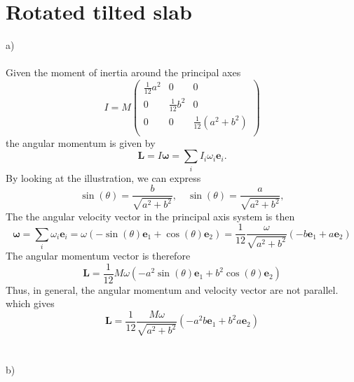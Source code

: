 \documentclass{article}
\begin{document}
    \section{Rotated tilted slab}
        a) \\ \\  
        Given the moment of inertia around the principal axes
        \begin{equation*}
            I = M
            \begin{pmatrix}
                \frac{1}{12} a^2& 0 & 0 \\
                0 & \frac{1}{12} b^2 & 0 \\
                0 & 0 & \frac{1}{12} (a^2 + b^2)\\
            \end{pmatrix}
        \end{equation*}
        the angular momentum is given by
        \begin{equation*}
            \mathbf{L} = I \mathbf{\omega} = \sum_i  I_i \omega_i  \mathbf{e}_i.
        \end{equation*}
        By looking at the illustration, we can express
        \begin{equation*}
            \sin(\theta) = \frac{b}{\sqrt{a^2 + b^2}}, \quad \sin(\theta) = \frac{a}{\sqrt{a^2 + b^2}},
        \end{equation*}
        The the angular velocity vector in the principal axis system is then
        \begin{equation*}
            \boldsymbol{\omega} = \sum_i \omega_i \mathbf{e}_i = \omega (-\sin(\theta) \mathbf{e}_1 + \cos(\theta) \mathbf{e}_2) = \frac{1}{12}\frac{\omega}{\sqrt{a^2 + b^2}}(-b \mathbf{e}_1 + a \mathbf{e}_2)
        \end{equation*} 
        The angular momentum vector is therefore
        \begin{equation*}
            \mathbf{L} = \frac{1}{12} M \omega(-a^2\sin(\theta) \mathbf{e}_1 + b^2\cos(\theta) \mathbf{e}_2)
        \end{equation*}
        Thus, in general, the angular momentum and velocity vector are not parallel. 
        which gives
        \begin{equation*}
            \mathbf{L} = \frac{1}{12}\frac{M \omega}{\sqrt{a^2 + b^2}}(-a^2b \mathbf{e}_1 + b^2a \mathbf{e}_2)
        \end{equation*} 
        \\ \\
        b) \\ \\
\end{document}

